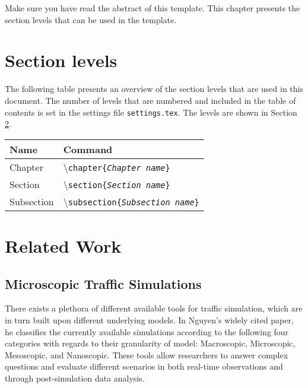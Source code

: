 
Make sure you have read the abstract of this template.
This chapter presents the section levels that can be used in the template. 

\section{Section levels}
The following table presents an overview of the section levels that are used in this document. The number of levels that are numbered and included in the table of contents is set in the settings file \texttt{settings.tex}. The levels are shown in Section \ref{Section_ref}.

\begin{table}[H]
\centering
\begin{tabular}{ll} \hline\hline
Name & Command\\ \hline
Chapter & \textbackslash\texttt{chapter\{\emph{Chapter name}\}}\\
Section & \textbackslash\texttt{section\{\emph{Section name}\}}\\
Subsection & \textbackslash\texttt{subsection\{\emph{Subsection name}\}}\\
\end{tabular}
\end{table}

\section{Related Work} \label{Section_ref}
\subsection{Microscopic Traffic Simulations}
There exists a plethora of different available tools for traffic simulation, which are in turn built upon different underlying models. In Nguyen’s widely cited paper, he classifies the currently available simulations according to the following four categories with regards to their granularity of model: Macroscopic, Microscopic, Mesoscopic, and Nanoscopic. These tools allow researchers to answer complex questions and evaluate different scenarios in both real-time observations and through post-simulation data analysis. \\

